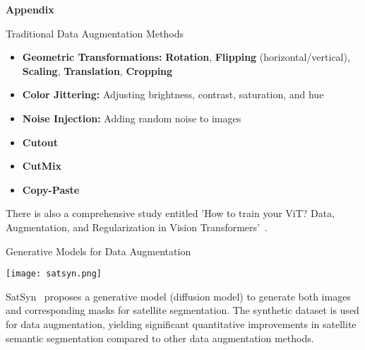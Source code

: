 \begin{refsection}
  \begin{frame}[plain]
    \vfill
    \centering
    {\Huge \textbf{Appendix}}
    \vfill
  \end{frame}
\end{refsection}

\begin{refsection}
  \begin{frame}{Traditional Data Augmentation Methods}
    \begin{itemize}
      \item \textbf{Geometric Transformations:} \textbf{Rotation}, \textbf{Flipping} (horizontal/vertical), \textbf{Scaling}, \textbf{Translation}, \textbf{Cropping}
      \item \textbf{Color Jittering:} Adjusting brightness, contrast, saturation, and hue
      \item \textbf{Noise Injection:} Adding random noise to images
      \item \textbf{Cutout}~\parencite{devriesImprovedRegularizationConvolutional2017}
      \item \textbf{CutMix}~\parencite{yunCutMixRegularizationStrategy2019}
      \item \textbf{Copy-Paste}~\parencite{ghiasiSimpleCopyPasteStrong2021}
    \end{itemize}
    There is also a comprehensive study entitled 'How to train your ViT? Data, Augmentation,  and Regularization in Vision Transformers'~\parencite{steinerHowTrainYour2022}.
    \bottomleftrefs
  \end{frame}
\end{refsection}

\begin{refsection}
  \begin{frame}{Generative Models for Data Augmentation}
    \begin{minipage}{0.7\linewidth}
      \texttt{[image: satsyn.png]}
    \end{minipage}%
    \hfill
    \begin{minipage}{0.3\linewidth}
      \scriptsize
      SatSyn~\parencite{tokerSatSynthAugmentingImageMask2024} proposes a generative model (diffusion model) to generate both images and corresponding masks for satellite segmentation. The synthetic dataset is used for data augmentation, yielding significant quantitative improvements in satellite semantic segmentation compared to other data augmentation methods.
    \end{minipage}
    \bottomleftrefs
  \end{frame}
\end{refsection}

